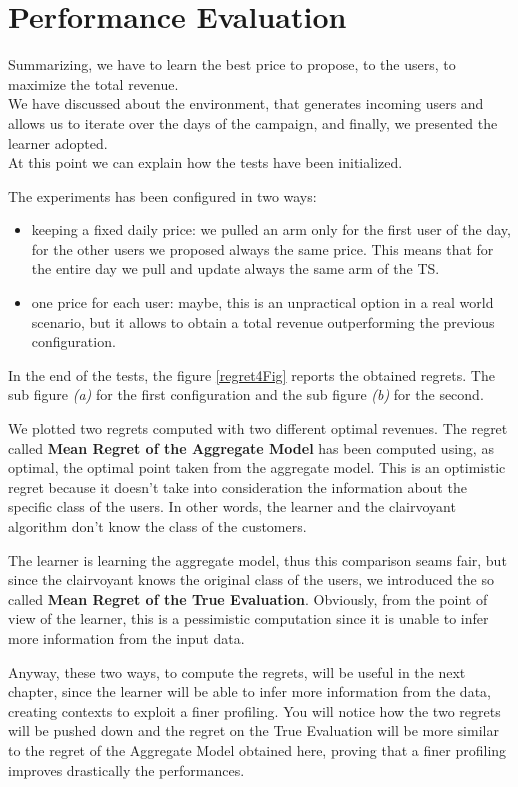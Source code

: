 \section{Performance Evaluation}

Summarizing, we have to learn the best price to propose, to the users, to maximize the total revenue.\\
We have discussed about the environment, that generates incoming users and allows us to iterate over the days of the campaign, and finally, we presented the learner adopted.\\
At this point we can explain how the tests have been initialized.

The experiments has been configured in two ways:
\begin{itemize}
	\item keeping a fixed daily price: we pulled an arm only for the first user of the day, for the other users we proposed always the same price. This means that for the entire day we pull and update always the same arm of the TS.
	\item one price for each user: maybe, this is an unpractical option in a real world scenario, but it allows to obtain a total revenue outperforming the previous configuration.
\end{itemize}

In the end of the tests, the figure \ref{regret4Fig} reports the obtained regrets. The sub figure \textit{(a)} for the first configuration and the sub figure \textit{(b)} for the second.

We plotted two regrets computed with two different optimal revenues.
The regret called \textbf{Mean Regret of the Aggregate Model} has been computed using, as optimal, the optimal point taken from the aggregate model. This is an optimistic regret because it doesn't take into consideration the information about the specific class of the users. In other words, the learner and the clairvoyant algorithm don't know the class of the customers.

The learner is learning the aggregate model, thus this comparison seams fair, but since the clairvoyant knows the original class of the users, we introduced the so called \textbf{Mean Regret of the True Evaluation}. Obviously, from the point of view of the learner, this is a pessimistic computation since it is unable to infer more information from the input data.

Anyway, these two ways, to compute the regrets, will be useful in the next chapter, since the learner will be able to infer more information from the data, creating contexts to exploit a finer profiling.
You will notice how the two regrets will be pushed down and the regret on the True Evaluation will be more similar to the regret of the Aggregate Model obtained here, proving that a finer profiling improves drastically the performances.


